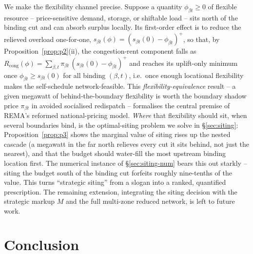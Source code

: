 \documentclass[review,3p,times]{elsarticle}
\theoremstyle{plain}
\theoremstyle{definition}
\begin{document}
We make the flexibility channel precise. Suppose a quantity $\phi_{\beta t}\ge0$
of flexible resource -- price-sensitive demand, storage, or shiftable load -- sits
north of the binding cut and can absorb surplus locally. Its first-order effect is
to reduce the relieved overload one-for-one, $s_{\beta t}(\phi)=
(s_{\beta t}(0)-\phi_{\beta t})^{+}$, so that, by Proposition~\ref{prop:p2}(ii),
the congestion-rent component falls as
$R_{\mathrm{cong}}(\phi)=\sum_{\beta,t}\pi_{\beta t}\,(s_{\beta t}(0)-
\phi_{\beta t})^{+}$ and reaches its uplift-only minimum once
$\phi_{\beta t}\ge s_{\beta t}(0)$ for all binding $(\beta,t)$, i.e.\ once enough
locational flexibility makes the self-schedule network-feasible. This
\emph{flexibility-equivalence} result -- a given megawatt of behind-the-boundary
flexibility is worth the boundary shadow price $\pi_{\beta t}$ in avoided
socialised redispatch -- formalises the central premise of REMA's reformed
national-pricing model. \emph{Where} that flexibility should sit, when several
boundaries bind, is the optimal-siting problem we solve in
\S\ref{sec:siting}: Proposition~\ref{prop:p3} shows the marginal value of siting
rises up the nested cascade (a megawatt in the far north relieves every cut it
sits behind, not just the nearest), and that the budget should water-fill the
most upstream binding location first. The numerical instance of
\S\ref{sec:siting-num} bears this out starkly -- siting the budget south of the
binding cut forfeits roughly nine-tenths of the value. This turns ``strategic
siting'' from a slogan into a ranked, quantified prescription. The remaining
extension, integrating the siting decision with the strategic markup $M$ and the
full multi-zone reduced network, is left to future work.

\section{Conclusion}
\label{sec:conclusion}
\end{document}

